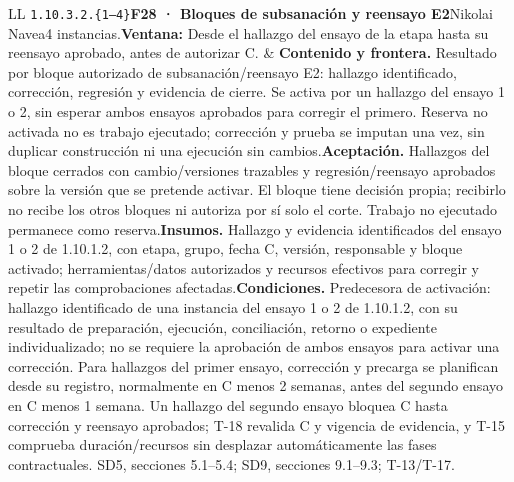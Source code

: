 \begin{longtable}{L{\tabcolsep\relax}L{\tabcolsep\relax}}
\texttt{1.\allowbreak{}10.\allowbreak{}3.\allowbreak{}2.\allowbreak{}\{1--4\}}\newline{}\textbf{F28 · Bloques de subsanación y reensayo E2}\newline{}Nikolai Navea\newline{}4 instancias.\newline{}\textbf{Ventana:} Desde el hallazgo del ensayo de la etapa hasta su reensayo aprobado, antes de autorizar C. & \textbf{Contenido y frontera.} Resultado por bloque autorizado de subsanación/reensayo E2: hallazgo identificado, corrección, regresión y evidencia de cierre. Se activa por un hallazgo del ensayo 1 o 2, sin esperar ambos ensayos aprobados para corregir el primero. Reserva no activada no es trabajo ejecutado; corrección y prueba se imputan una vez, sin duplicar construcción ni una ejecución sin cambios.\newline{}\textbf{Aceptación.} Hallazgos del bloque cerrados con cambio/versiones trazables y regresión/reensayo aprobados sobre la versión que se pretende activar. El bloque tiene decisión propia; recibirlo no recibe los otros bloques ni autoriza por sí solo el corte. Trabajo no ejecutado permanece como reserva.\newline{}\textbf{Insumos.} Hallazgo y evidencia identificados del ensayo 1 o 2 de 1.10.1.2, con etapa, grupo, fecha C, versión, responsable y bloque activado; herramientas/datos autorizados y recursos efectivos para corregir y repetir las comprobaciones afectadas.\newline{}\textbf{Condiciones.} Predecesora de activación: hallazgo identificado de una instancia del ensayo 1 o 2 de 1.10.1.2, con su resultado de preparación, ejecución, conciliación, retorno o expediente individualizado; no se requiere la aprobación de ambos ensayos para activar una corrección. Para hallazgos del primer ensayo, corrección y precarga se planifican desde su registro, normalmente en C menos 2 semanas, antes del segundo ensayo en C menos 1 semana. Un hallazgo del segundo ensayo bloquea C hasta corrección y reensayo aprobados; T-18 revalida C y vigencia de evidencia, y T-15 comprueba duración/recursos sin desplazar automáticamente las fases contractuales. SD5, secciones 5.1--5.4; SD9, secciones 9.1--9.3; T-13/T-17.\\\hline
\end{longtable}\endgroup
\begingroup\setlength{\tabcolsep}{3pt}
